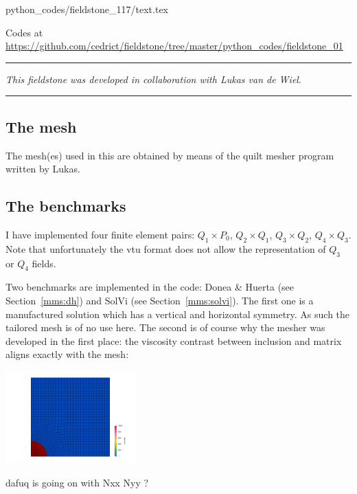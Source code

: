 \begin{flushright} {\tiny {\color{gray} python\_codes/fieldstone\_117/text.tex}} \end{flushright}



\begin{center}

Codes at \url{https://github.com/cedrict/fieldstone/tree/master/python_codes/fieldstone_01}
\end{center}

\par\noindent\rule{\textwidth}{0.4pt}

{\sl This fieldstone was developed in collaboration with Lukas van de Wiel}. 

\par\noindent\rule{\textwidth}{0.4pt}


\subsection*{The mesh}

The mesh(es) used in this \stone are obtained by means of the quilt mesher program written by Lukas. 






\subsection*{The benchmarks}

I have implemented four finite element pairs: $Q_1\times P_0$, $Q_2\times Q_1$, $Q_3\times Q_2$, $Q_4\times Q_3$.
Note that unfortunately the vtu format does not allow the representation of $Q_3$ or $Q_4$ fields. 

Two benchmarks are implemented in the code: Donea \& Huerta (see Section~\ref{mms:dh}) and SolVi (see Section~\ref{mms:solvi}).
The first one is a manufactured solution which has a vertical and horizontal symmetry. As such the tailored mesh 
is of no use here. The second is of course why the mesher was developed in the first place: the viscosity contrast between 
inclusion and matrix aligns exactly with the mesh:

\begin{center}
\includegraphics[width=5cm]{python_codes/fieldstone_117/images/visc}
\end{center}

 

dafuq is going on with Nxx Nyy ? 

